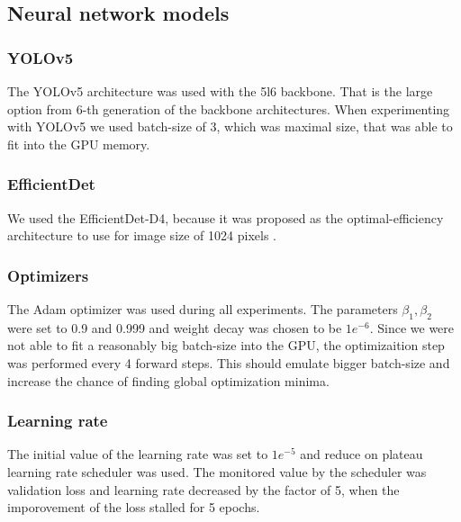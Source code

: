 \subsection{Neural network models}
\subsubsection{YOLOv5}
The YOLOv5 architecture was used with the 5l6 backbone. That is the large option from 6-th generation of the backbone architectures. When experimenting with YOLOv5 we used batch-size of 3, which was maximal size, that was able to fit into the GPU memory.
\subsubsection{EfficientDet}
We used the EfficientDet-D4, because it was proposed as the optimal-efficiency architecture to use for image size of 1024 pixels \cite{Tan2019}.

\subsubsection{Optimizers}
The Adam optimizer was used during all experiments. The parameters $\beta_1, \beta_2$ were set to 0.9 and 0.999 and weight decay was chosen to be $1e^{-6}$. Since we were not able to fit a reasonably big batch-size into the GPU, the optimizaition step was performed every 4 forward steps. This should emulate bigger batch-size and increase the chance of finding global optimization minima.
\subsubsection{Learning rate}
The initial value of the learning rate was set to $1e^{-5}$ and reduce on plateau learning rate scheduler was used. The monitored value by the scheduler was validation loss and learning rate decreased by the factor of 5, when the imporovement of the loss stalled for 5 epochs.


